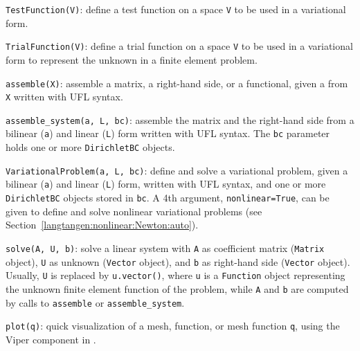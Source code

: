 {\fontsize{10pt}{10pt}\texttt{TestFunction(V)}}: define a test function on a space {\fontsize{10pt}{10pt}\texttt{V}} to be used
in a variational form.\gln

{\fontsize{10pt}{10pt}\texttt{TrialFunction(V)}}: define a trial function on a space {\fontsize{10pt}{10pt}\texttt{V}} to be used
in a variational form to represent the unknown in a finite element problem.\gln

{\fontsize{10pt}{10pt}\texttt{assemble(X)}}: assemble a matrix, a right-hand side, or a functional,
given a from {\fontsize{10pt}{10pt}\texttt{X}} written with UFL syntax.\gln

{\fontsize{10pt}{10pt}\verb!assemble_system(a, L, bc)!}: assemble the matrix and the right-hand
side from a bilinear ({\fontsize{10pt}{10pt}\texttt{a}}) and linear ({\fontsize{10pt}{10pt}\texttt{L}}) form written with UFL
syntax. The {\fontsize{10pt}{10pt}\texttt{bc}} parameter holds one or more {\fontsize{10pt}{10pt}\texttt{DirichletBC}} objects.\gln

{\fontsize{10pt}{10pt}\texttt{VariationalProblem(a, L, bc)}}: define and solve a variational problem,
given a bilinear ({\fontsize{10pt}{10pt}\texttt{a}}) and linear ({\fontsize{10pt}{10pt}\texttt{L}}) form, written with UFL
syntax, and one or more {\fontsize{10pt}{10pt}\texttt{DirichletBC}} objects stored in {\fontsize{10pt}{10pt}\texttt{bc}}.
A 4th argument, {\fontsize{10pt}{10pt}\texttt{nonlinear=True}}, can be given to define and solve
nonlinear variational problems (see Section~\ref{langtangen:nonlinear:Newton:auto}).\gln

{\fontsize{10pt}{10pt}\texttt{solve(A, U, b)}}: solve a linear system with {\fontsize{10pt}{10pt}\texttt{A}} as coefficient
matrix ({\fontsize{10pt}{10pt}\texttt{Matrix}} object), {\fontsize{10pt}{10pt}\texttt{U}} as unknown ({\fontsize{10pt}{10pt}\texttt{Vector}} object),
and {\fontsize{10pt}{10pt}\texttt{b}} as right-hand side ({\fontsize{10pt}{10pt}\texttt{Vector}} object).
Usually, {\fontsize{10pt}{10pt}\texttt{U}} is replaced by {\fontsize{10pt}{10pt}\texttt{u.vector()}}, where
{\fontsize{10pt}{10pt}\texttt{u}} is a {\fontsize{10pt}{10pt}\texttt{Function}} object representing the unknown finite
element function of the problem, while
{\fontsize{10pt}{10pt}\texttt{A}} and {\fontsize{10pt}{10pt}\texttt{b}} are computed by calls to {\fontsize{10pt}{10pt}\texttt{assemble}}
or {\fontsize{10pt}{10pt}\verb!assemble_system!}.\gln

{\fontsize{10pt}{10pt}\texttt{plot(q)}}: quick visualization of a mesh, function, or mesh function
{\fontsize{10pt}{10pt}\texttt{q}}, using the Viper component in \fenics{}.\gln

